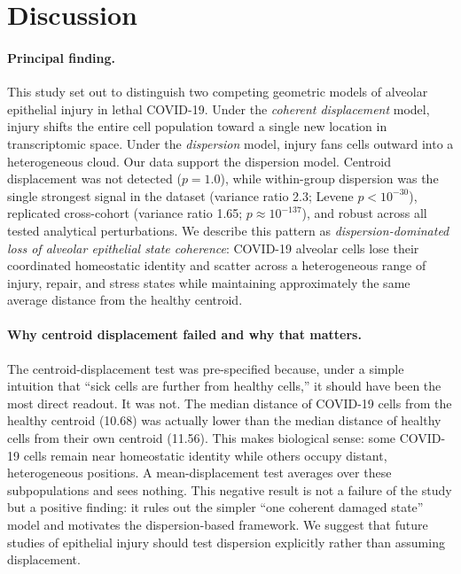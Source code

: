 \documentclass[11pt]{article}
\begin{document}
\section{Discussion}

\paragraph{Principal finding.} This study set out to distinguish two competing geometric models of alveolar epithelial injury in lethal COVID-19. Under the \emph{coherent displacement} model, injury shifts the entire cell population toward a single new location in transcriptomic space. Under the \emph{dispersion} model, injury fans cells outward into a heterogeneous cloud. Our data support the dispersion model. Centroid displacement was not detected ($p = 1.0$), while within-group dispersion was the single strongest signal in the dataset (variance ratio 2.3; Levene $p < 10^{-30}$), replicated cross-cohort (variance ratio 1.65; $p \approx 10^{-137}$), and robust across all tested analytical perturbations. We describe this pattern as \emph{dispersion-dominated loss of alveolar epithelial state coherence}: COVID-19 alveolar cells lose their coordinated homeostatic identity and scatter across a heterogeneous range of injury, repair, and stress states while maintaining approximately the same average distance from the healthy centroid.

\paragraph{Why centroid displacement failed and why that matters.} The centroid-displacement test was pre-specified because, under a simple intuition that ``sick cells are further from healthy cells,'' it should have been the most direct readout. It was not. The median distance of COVID-19 cells from the healthy centroid (10.68) was actually lower than the median distance of healthy cells from their own centroid (11.56). This makes biological sense: some COVID-19 cells remain near homeostatic identity while others occupy distant, heterogeneous positions. A mean-displacement test averages over these subpopulations and sees nothing. This negative result is not a failure of the study but a positive finding: it rules out the simpler ``one coherent damaged state'' model and motivates the dispersion-based framework. We suggest that future studies of epithelial injury should test dispersion explicitly rather than assuming displacement.
\end{document}
